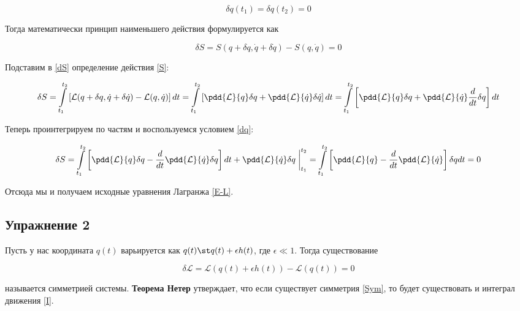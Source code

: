 \documentclass[12pt]{kiarticle}
\newcommand{\Ll}{\ensuremath{\mathcal{L}}}
\begin{document}
\begin{equation}\label{dq}
\delta q(t_1) = \delta q (t_2) = 0
\end{equation}

Тогда математически принцип наименьшего действия формулируется как

\begin{equation}\label{dS}
\delta S = S(q + \delta q, \dot{q} + \delta \dot{q}) - S (q, \dot{q}) = 0
\end{equation}

Подставим в \eqref{dS} определение действия \eqref{S}: 

\begin{equation}\label{}
 \delta S= \int\limits_{t_1}^{t_2} \left[ \Ll(q + \delta q, \dot{q} + \delta \dot{q})  -  \Ll(q, \dot{q}) \right]  dt = \int\limits_{t_1}^{t_2} \left [ \pdd{\Ll}{q}\delta q + \pdd{\Ll}{\dot{q}}\delta\dot{q} \right ] dt =  \int\limits_{t_1}^{t_2} \left [ \pdd{\Ll}{q}\delta q + \pdd{\Ll}{\dot{q}} \dfrac{d}{dt}\delta q \right ] dt
\end{equation}

Теперь проинтегрируем по частям и воспользуемся условием \eqref{dq}:

\begin{equation}\label{}
\delta S = \int\limits_{t_1}^{t_2} \left [ \pdd{\Ll}{q}\delta q - \dfrac{d}{dt} \pdd{\Ll}{\dot{q}} \delta q \right ] dt + \pdd{\Ll}{\dot{q}} \delta q \; \bigg |_{t_1}^{t_2} =  \int\limits_{t_1}^{t_2} \left [ \pdd{\Ll}{q} - \dfrac{d}{dt} \pdd{\Ll}{\dot{q}}  \right ]\delta q dt  = 0
\end{equation}

Отсюда мы и получаем исходные уравнения Лагранжа \eqref{E-L}. 


\subsection{Упражнение 2}

Пусть у нас координата $ q(t) $ варьируется как $ q(t) \st q(t) + \epsilon h(t) $, где $ \epsilon \ll 1 $. Тогда существование 

\begin{equation}\label{Sym}
\delta \Ll = \Ll (q(t) + \epsilon h(t)) - \Ll (q(t)) = 0 
\end{equation}

называется симметрией системы. \textbf{Теорема Нетер} утверждает, что если существует симметрия \eqref{Sym}, то будет существовать и интеграл движения \eqref{I}. 
\end{document}
